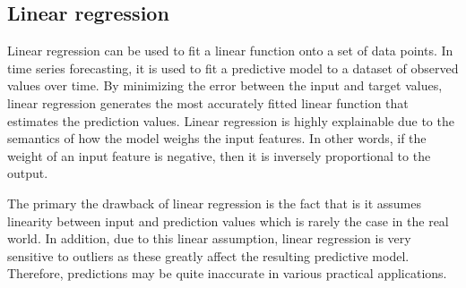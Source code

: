 \subsection{Linear regression}
Linear regression can be used to fit a linear function onto a set of data points.
In time series forecasting, it is used to fit a predictive model to a dataset of observed values over time.
By minimizing the error between the input and target values, linear regression generates the most accurately fitted linear function that estimates the prediction values.
Linear regression is highly explainable due to the semantics of how the model weighs the input features. 
In other words, if the weight of an input feature is negative, then it is inversely proportional to the output. \cite{pooleArtificialIntelligenceFoundations2017}

The primary the drawback of linear regression is the fact that is it assumes linearity between input and prediction values which is rarely the case in the real world.
In addition, due to this linear assumption, linear regression is very sensitive to outliers as these greatly affect the resulting predictive model.
Therefore, predictions may be quite inaccurate in various practical applications. \cite{kumarProfessionalsPointAdvantages2019}